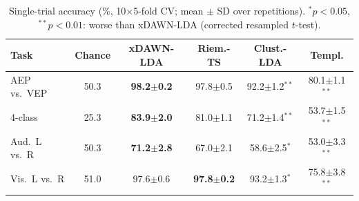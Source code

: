 \begin{table}[t]
\centering
\caption{Single-trial accuracy (\%, 10$\times$5-fold CV; mean $\pm$ SD over repetitions). $^{*}p<0.05$, $^{**}p<0.01$: worse than xDAWN-LDA (corrected resampled $t$-test).}
\label{tab:cls}
\setlength{\tabcolsep}{1.6pt}
\footnotesize
\begin{tabular}{lccccc}
\toprule
Task & Chance & xDAWN-LDA & Riem.-TS & Clust.-LDA & Templ. \\
\midrule
AEP vs.\ VEP & 50.3 & \textbf{98.2$\pm$0.2} & 97.8$\pm$0.5 & 92.2$\pm$1.2$^{**}$ & 80.1$\pm$1.1$^{**}$ \\
4-class & 25.3 & \textbf{83.9$\pm$2.0} & 81.0$\pm$1.1 & 71.2$\pm$1.4$^{**}$ & 53.7$\pm$1.5$^{**}$ \\
Aud.\ L vs.\ R & 50.3 & \textbf{71.2$\pm$2.8} & 67.0$\pm$2.1 & 58.6$\pm$2.5$^{*}$ & 53.0$\pm$3.3$^{**}$ \\
Vis.\ L vs.\ R & 51.0 & 97.6$\pm$0.6 & \textbf{97.8$\pm$0.2} & 93.2$\pm$1.3$^{*}$ & 75.8$\pm$3.8$^{**}$ \\
\bottomrule
\end{tabular}
\end{table}

